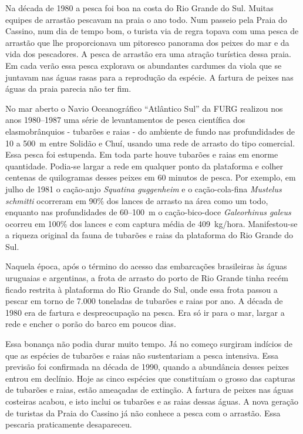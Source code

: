 \documentclass[a4paper,11pt,twoside,showtrims,onecolumn,openright,final]{memoir}
\begin{document}
\thispagestyle{empty}

Na década de 1980 a pesca foi boa na costa do Rio Grande do Sul. Muitas equipes de arrastão 
pescavam na praia o ano todo. Num passeio pela Praia do Cassino, num dia de tempo bom, o turista 
via de regra topava com uma pesca de arrastão que lhe proporcionava um pitoresco panorama dos peixes 
do mar e da vida dos pescadores. A pesca de arrastão era uma atração turística dessa praia. 
Em cada verão essa pesca explorava os abundantes cardumes da viola que se juntavam nas águas rasas 
para a reprodução da espécie. A fartura de peixes nas águas da praia parecia não ter fim.

No mar aberto o Navio Oceanográfico ``Atlântico Sul'' da FURG realizou nos anos  1980--1987 
uma série de levantamentos de pesca científica dos elasmobrânquios - tubarões e raias - do 
ambiente de fundo nas profundidades de 10 a 500~m entre Solidão e Chuí, 
usando uma rede de arrasto do tipo comercial. Essa pesca foi estupenda. 
Em toda parte houve tubarões e raias em enorme quantidade. Podia-se largar a rede em qualquer ponto da 
plataforma e colher centenas de quilogramas desses peixes em 60 minutos de pesca. 
Por exemplo, em julho de 1981 o cação-anjo \emph{Squatina guggenheim} e 
o cação-cola-fina \emph{Mustelus schmitti} ocorreram em 90\% dos lances de arrasto na área como um todo, 
enquanto nas profundidades de 60--100~m o cação-bico-doce \emph{Galeorhinus galeus} ocorreu em 100\% 
dos lances e com captura média de 409~kg/hora. Manifestou-se a riqueza original da fauna de tubarões 
e raias da plataforma do Rio Grande do Sul. 

Naquela época, após o término do acesso das embarcações brasileiras às águas uruguaias e argentinas, 
a frota de arrasto do porto de Rio Grande tinha recém ficado restrita à plataforma do Rio Grande do Sul, 
onde essa frota passou a pescar em torno de 7.000 toneladas de tubarões e raias por ano. 
A década de 1980 era de fartura e despreocupação na pesca. Era só ir para o mar, largar a rede e encher 
o porão do barco em poucos dias.

Essa bonança não podia durar muito tempo. Já no começo surgiram indícios de que  as espécies 
de tubarões e raias não sustentariam a pesca intensiva. Essa previsão foi confirmada na década de 1990, 
quando a abundância desses peixes entrou em declínio. Hoje as cinco espécies que constituíam 
o grosso das capturas de tubarões e raias, estão ameaçadas de extinção. A fartura de peixes nas 
águas costeiras acabou, e isto inclui os tubarões e as raias dessas águas. 
A nova geração de turistas da Praia do Cassino já não conhece a pesca com o arrastão. 
Essa pescaria praticamente desapareceu.
\end{document}
